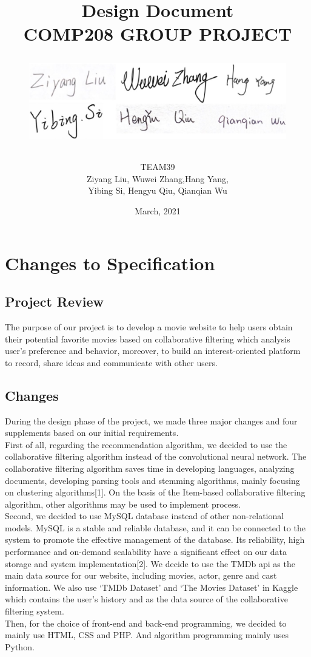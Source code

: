 \documentclass[12pt]{article}
\title{
\vspace{3cm}
\Huge \textbf{Design Document\\}
\vspace{1cm}
\LARGE {COMP208 GROUP PROJECT\\}
\vspace{3cm}
\item
\begin{figure}[H]
\centering
\includegraphics[scale = 0.25]{sign.jpg}
\vspace{2cm}
\end{figure}
}
\author{\LARGE TEAM39\\Ziyang Liu, Wuwei Zhang,Hang Yang, \\Yibing Si, Hengyu Qiu, Qianqian Wu}
\date{March, 2021}
\begin{document}
\maketitle
\newpage
\tableofcontents
\newpage

\section{Changes to Specification}
\subsection{Project Review}
The purpose of our project is to develop a movie website to help users obtain their potential favorite movies based on collaborative filtering which analysis user’s preference and behavior, moreover, to build an interest-oriented platform to record, share ideas and communicate with other users.

\subsection{Changes}
During the design phase of the project, we made three major changes and four supplements based on our initial requirements.\\
First of all, regarding the recommendation algorithm, we decided to use the collaborative filtering algorithm instead of the convolutional neural network. The collaborative filtering algorithm saves time in developing languages, analyzing documents, developing parsing tools and stemming algorithms, mainly focusing on clustering algorithms[1]. On the basis of the Item-based collaborative filtering algorithm, other algorithms may be used to implement process.\\
Second, we decided to use MySQL database instead of other non-relational models. MySQL is a stable and reliable database, and it can be connected to the system to promote the effective management of the database. Its reliability, high performance and on-demand scalability have a significant effect on our data storage and system implementation[2]. We decide to use the TMDb api as the main data source for our website, including movies, actor, genre and cast information. We also use ‘TMDb Dataset’ and ‘The Movies Dataset’ in Kaggle which contains the user’s history and as the data source of the collaborative filtering system.\\
Then, for the choice of front-end and back-end programming, we decided to mainly use HTML, CSS and PHP. And algorithm programming mainly uses Python.\\
\end{document}
